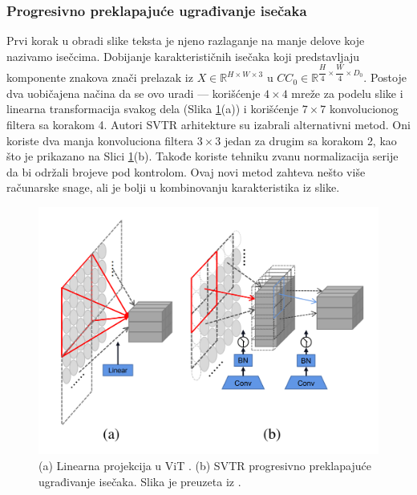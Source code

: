 \documentclass[a4paper,12pt]{article}
\begin{document}
	\subsubsection{Progresivno preklapajuće ugrađivanje isečaka}
	
	Prvi korak u obradi slike teksta je njeno razlaganje na manje delove koje nazivamo isečcima. Dobijanje karakterističnih isečaka koji predstavljaju komponente znakova znači prelazak iz \(X \in \mathbb{R}^{H \times W \times 3}\) u \(CC_0 \in \mathbb{R}^{\dfrac{H}{4} \times \dfrac{W}{4} \times D_0}\). Postoje dva uobičajena načina da se ovo uradi — korišćenje \(4 \times 4\) mreže za podelu slike i linearna transformacija svakog dela (Slika \ref{fig:linear-projection-in-ViT}(a)) i korišćenje \(7 \times 7\) konvolucionog filtera sa korakom 4. Autori SVTR arhitekture su izabrali alternativni metod. Oni koriste dva manja konvoluciona filtera \(3 \times 3\) jedan za drugim sa korakom 2, kao što je prikazano na Slici \ref{fig:linear-projection-in-ViT}(b). Takođe koriste tehniku zvanu normalizacija serije da bi održali brojeve pod kontrolom. Ovaj novi metod zahteva nešto više računarske snage, ali je bolji u kombinovanju karakteristika iz slike.

	\begin{figure}[H]
		\centering
		\includegraphics[width=\textwidth]{assets/linear-projection-in-ViT.png}
		\caption{(a) Linearna projekcija u ViT \cite{dosovitskiy2021imageworth16x16words}. (b) SVTR progresivno preklapajuće ugrađivanje isečaka. Slika je preuzeta iz \cite{du2022svtrscenetextrecognition}.}
		\label{fig:linear-projection-in-ViT}
	\end{figure}
	
\end{document}
